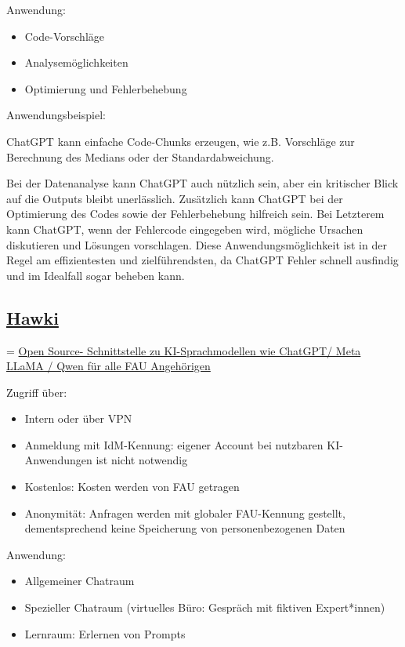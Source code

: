 \documentclass[
  letterpaper,
  DIV=11]{scrreprt}
\begin{document}
Anwendung:

\begin{itemize}
\item
  Code-Vorschläge
\item
  Analysemöglichkeiten
\item
  Optimierung und Fehlerbehebung
\end{itemize}

Anwendungsbeispiel:

ChatGPT kann einfache Code-Chunks erzeugen, wie z.B. Vorschläge zur
Berechnung des Medians oder der Standardabweichung.

Bei der Datenanalyse kann ChatGPT auch nützlich sein, aber ein
kritischer Blick auf die Outputs bleibt unerlässlich. Zusätzlich kann
ChatGPT bei der Optimierung des Codes sowie der Fehlerbehebung hilfreich
sein. Bei Letzterem kann ChatGPT, wenn der Fehlercode eingegeben wird,
mögliche Ursachen diskutieren und Lösungen vorschlagen. Diese
Anwendungsmöglichkeit ist in der Regel am effizientesten und
zielführendsten, da ChatGPT Fehler schnell ausfindig und im Idealfall
sogar beheben kann.

\subsection{\texorpdfstring{\href{https://www.intern.fau.de/informationstechnik-it/laufende-projekte/hawki-schnittstelle-fuer-ki-sprachmodelle/}{Hawki}}{Hawki}}\label{hawki}

=
\href{https://www.fau.de/2024/09/news/studium/chatgpt-und-co-fuer-alle-fau-mitglieder/}{Open
Source- Schnittstelle zu KI-Sprachmodellen wie ChatGPT/ Meta LLaMA /
Qwen für alle FAU Angehörigen}

Zugriff über:

\begin{itemize}
\item
  Intern oder über VPN
\item
  Anmeldung mit IdM-Kennung: eigener Account bei nutzbaren
  KI-Anwendungen ist nicht notwendig
\item
  Kostenlos: Kosten werden von FAU getragen
\item
  Anonymität: Anfragen werden mit globaler FAU-Kennung gestellt,
  dementsprechend keine Speicherung von personenbezogenen Daten
\end{itemize}

Anwendung:

\begin{itemize}
\item
  Allgemeiner Chatraum
\item
  Spezieller Chatraum (virtuelles Büro: Gespräch mit fiktiven
  Expert*innen)
\item
  Lernraum: Erlernen von Prompts
\end{itemize}
\end{document}
